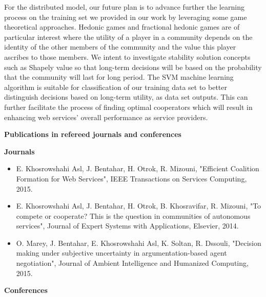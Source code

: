 For the distributed model, our future plan is to advance further the learning process on the training set we provided in our work by leveraging some game theoretical approaches. Hedonic games and fractional hedonic games \cite{Brandl:2015:FHG:2772879.2773307, Aziz_GGMT_70} are of particular interest where the utility of a player in a community depends on the identity of the other members of the community and the value this player ascribes to those members. We intent to investigate stability solution concepts such as Shapely value so that long-term decisions will be based on the probability that the community will last for long period. The SVM machine learning algorithm \cite{Osuna97trainingsupport, Cortes:1995:SN:218919.218929} is suitable for classification of our training data set to better distinguish  decisions based on long-term utility, as data set outputs. This can further facilitate the process of finding optimal cooperators which will result in enhancing web services' overall performance as service providers.

\newpage
\textbf{Publications in refereed journals and conferences}

\textbf{Journals}

\begin{itemize}
\item E. Khosrowshahi Asl, J. Bentahar, H. Otrok, R. Mizouni, "Efficient Coalition Formation for Web Services", IEEE Transactions on Services Computing, 2015.

\item E. Khosrowshahi Asl, J. Bentahar, H. Otrok, B. Khosravifar, R. Mizouni, "To compete or cooperate? This is the question in communities of autonomous services", Journal of Expert Systems with Applications, Elsevier, 2014.

\item O. Marey, J. Bentahar, E. Khosrowshahi Asl, K. Soltan, R. Dssouli, "Decision making under subjective uncertainty in argumentation-based agent negotiation", Journal of Ambient Intelligence and Humanized Computing, 2015.

\end{itemize}

\textbf{Conferences}

